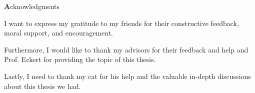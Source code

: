 
\vspace*{2cm}

\begin{center}
{ \textbf Acknowledgments}
\end{center}

\vspace{1cm}

\noindent
I want to express my gratitude to my friends for their constructive feedback, moral support, and encouragement.

\noindent
Furthermore, I would like to thank my advisors for their feedback and help and Prof. Eckert for providing the topic of this thesis.

\noindent
Lastly, I need to thank my cat for his help and the valuable in-depth discussions about this thesis we had.

\cleardoublepage{}
